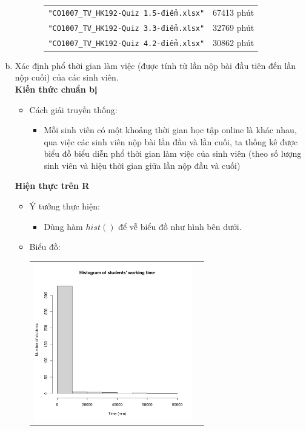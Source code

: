 \documentclass[a4paper]{article}
\theoremstyle{definition}
\begin{document}
\begin{enumerate}[a)]
\begin{itemize}
\begin{itemize}
\begin{center}
\begin{tabular}{l l}
                     \texttt{"CO1007\_TV\_HK192-Quiz 1.5-điểm.xlsx"} & 67413 phút\\ 
                     \texttt{"CO1007\_TV\_HK192-Quiz 3.3-điểm.xlsx"} & 32769 phút\\ 
                     \texttt{"CO1007\_TV\_HK192-Quiz 4.2-điểm.xlsx"} & 30862 phút\\ 
                \end{tabular}
            \end{center}
        \end{itemize}
    \end{itemize}
    \bf\item {Xác định phổ thời gian làm việc (được tính từ lần nộp bài đầu tiên đến lần nộp cuối) của các sinh viên.}\\[6pt]
    \bf Kiến thức chuẩn bị\normalfont
    \begin{itemize}
        \item Cách giải truyền thống:
        \begin{itemize}
            \item Mỗi sinh viên có một khoảng thời gian học tập online là khác nhau, qua việc các sinh viên nộp bài lần đầu và lần cuối, ta thống kê được biểu đồ biểu diễn phổ thời gian làm việc của sinh viên (theo số lượng sinh viên và hiệu thời gian giữa lần nộp đầu và cuối)
        \end{itemize}
    \end{itemize}
    \bf Hiện thực trên R\normalfont
    \begin{itemize}
        \item Ý tưởng thực hiện:
        \begin{itemize}
            \item Dùng hàm $hist()$ để vễ biểu đồ như hình bên dưới.
        \end{itemize}
        \item Biểu đồ:\\
        \begin{center}
            \begin{tabular}{c c}
                 \includegraphics[width = 6.9cm]{Images/img4-1-1.png} & 

\end{tabular}
\end{center}
\end{itemize}
\end{enumerate}
\end{document}
